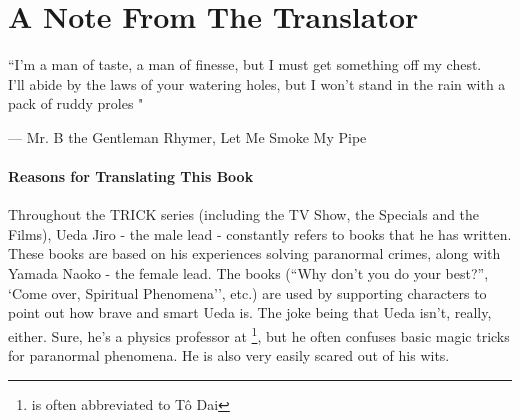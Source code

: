 

\chapter*{A Note From The Translator}

\epigraph{``I’m a man of taste, a man of finesse, but I must get something off my chest.\\I’ll abide by the laws of your watering holes, but I won’t stand in the rain with a pack of ruddy proles "}{--- \textup{Mr. B the Gentleman Rhymer}, Let Me Smoke My Pipe}

\subsubsection{Reasons for Translating This Book}

Throughout the TRICK series (including the TV Show, the Specials and the Films), Ueda Jiro - the male lead - constantly refers to books that he has written. These books are based on his experiences solving paranormal crimes, along with Yamada Naoko - the female lead. The books (``Why don't you do your best?'', `Come over, Spiritual Phenomena'', etc.) are used by supporting characters to point out how brave and smart Ueda is. The joke being that Ueda isn't, really, either. Sure, he's a physics professor at \footnote{ is often abbreviated to T\^{o} Dai}, but he often confuses basic magic tricks for paranormal phenomena. He is also very easily scared out of his wits.

